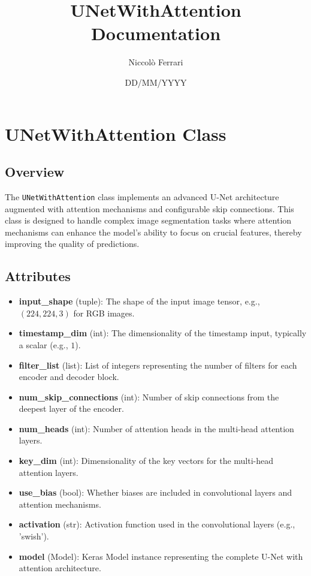 \documentclass{article}
\title{UNetWithAttention Documentation}
\author{Niccolò Ferrari}
\date{DD/MM/YYYY}
\begin{document}
\maketitle

\section{UNetWithAttention Class}

\subsection{Overview}

The \texttt{UNetWithAttention} class implements an advanced U-Net architecture augmented with attention mechanisms and configurable skip connections. This class is designed to handle complex image segmentation tasks where attention mechanisms can enhance the model's ability to focus on crucial features, thereby improving the quality of predictions.

\subsection{Attributes}

\begin{itemize}
    \item \textbf{input\_shape} (tuple): The shape of the input image tensor, e.g., \((224, 224, 3)\) for RGB images.
    \item \textbf{timestamp\_dim} (int): The dimensionality of the timestamp input, typically a scalar (e.g., \(1\)).
    \item \textbf{filter\_list} (list): List of integers representing the number of filters for each encoder and decoder block.
    \item \textbf{num\_skip\_connections} (int): Number of skip connections from the deepest layer of the encoder.
    \item \textbf{num\_heads} (int): Number of attention heads in the multi-head attention layers.
    \item \textbf{key\_dim} (int): Dimensionality of the key vectors for the multi-head attention layers.
    \item \textbf{use\_bias} (bool): Whether biases are included in convolutional layers and attention mechanisms.
    \item \textbf{activation} (str): Activation function used in the convolutional layers (e.g., 'swish').
    \item \textbf{model} (Model): Keras Model instance representing the complete U-Net with attention architecture.
\end{itemize}
\end{document}

